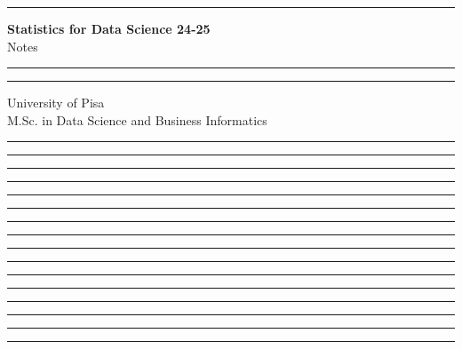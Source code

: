 \documentclass[11pt]{article}
\newcommand{\separate}{\begin{center}\textcolor{NavyBlue}{\rule{16cm}{1mm}}\end{center}}
\begin{document}
\begin{titlepage}
    \hrule
    \vspace{15pt}
    \begin{center}
        \Huge{\textbf{\Huge \textbf{Statistics for Data Science 24-25}} \\ Notes}\\
    \end{center}
    \vspace{15pt}
    \hrule
    \vfill
    \hrule
    \begin{center}
        \Large University of Pisa \\ M.Sc. in Data Science and Business Informatics
    \end{center}
\end{titlepage}

\tableofcontents
\clearpage


\separate
\separate
\separate
\separate
\separate
\separate
\separate
\separate
\separate
\separate
\separate
\separate
\separate
\separate
\separate
\separate

\end{document}
